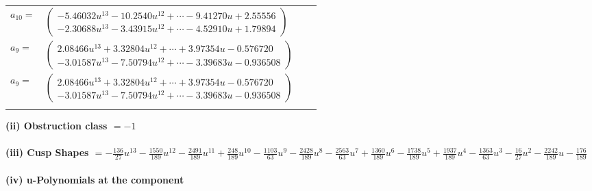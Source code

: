 \documentclass[1p]{elsarticle_modified}
\theoremstyle{definition}
\begin{document}
\begin{tabular}{m{7pt} m{180pt} m{7pt} m{180pt} }
\flushright $a_{10}=$&$\begin{pmatrix}-5.46032 u^{13}-10.2540 u^{12}+\cdots-9.41270 u+2.55556\\-2.30688 u^{13}-3.43915 u^{12}+\cdots-4.52910 u+1.79894\end{pmatrix}$ \\
\flushright $a_{9}=$&$\begin{pmatrix}2.08466 u^{13}+3.32804 u^{12}+\cdots+3.97354 u-0.576720\\-3.01587 u^{13}-7.50794 u^{12}+\cdots-3.39683 u-0.936508\end{pmatrix}$\\ \flushright $a_{9}=$&$\begin{pmatrix}2.08466 u^{13}+3.32804 u^{12}+\cdots+3.97354 u-0.576720\\-3.01587 u^{13}-7.50794 u^{12}+\cdots-3.39683 u-0.936508\end{pmatrix}$\\&\end{tabular}
\flushleft \textbf{(ii) Obstruction class $= -1$}\\~\\
\flushleft \textbf{(iii) Cusp Shapes $= -\frac{136}{27} u^{13}-\frac{1550}{189} u^{12}-\frac{2491}{189} u^{11}+\frac{248}{189} u^{10}-\frac{1103}{63} u^9-\frac{2428}{189} u^8-\frac{2563}{63} u^7+\frac{1360}{189} u^6-\frac{1738}{189} u^5+\frac{1937}{189} u^4-\frac{1363}{63} u^3-\frac{16}{27} u^2-\frac{2242}{189} u-\frac{176}{189}$}\\~\\
\newpage\renewcommand{\arraystretch}{1}
\flushleft \textbf{(iv) u-Polynomials at the component}\newline \\
\end{document}
